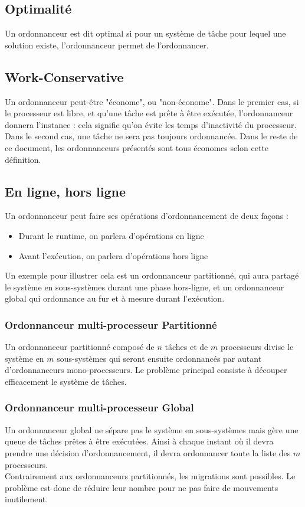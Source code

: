 \documentclass[11pt,a4paper,oneside]{report}
\begin{document}
\subsection{Optimalité}\label{optimal}
Un ordonnanceur est dit optimal si pour un système de tâche pour lequel une solution 
existe, l'ordonnanceur permet de l'ordonnancer.

\subsection{Work-Conservative} 
Un ordonnanceur peut-être "économe", ou "non-économe". Dans le premier cas, si le processeur est libre, 
et qu'une tâche est prête à être exécutée, l'ordonnanceur donnera l'instance : cela signifie 
qu'on évite les temps d'inactivité du processeur. Dans le second cas, une tâche ne sera pas toujours ordonnancée.
Dans le reste de ce document, les ordonnanceurs présentés sont tous économes selon cette définition.

\subsection{En ligne, hors ligne}
Un ordonnanceur peut faire ses opérations d'ordonnancement de deux façons : \\
\begin{itemize}
	\item Durant le runtime, on parlera d'opérations en ligne
	\item Avant l'exécution, on parlera d'opérations hors ligne
\end{itemize}
Un exemple pour illustrer cela est un ordonnanceur partitionné, qui aura partagé le système 
en sous-systèmes durant une phase hors-ligne, et un ordonnanceur global qui 
ordonnance au fur et à mesure durant l'exécution. 


\subsubsection{Ordonnanceur multi-processeur Partitionné}
Un ordonnanceur partitionné composé de $n$ tâches et de $m$ processeurs divise 
le système en $m$ sous-systèmes qui seront ensuite ordonnancés par autant d'ordonnanceurs 
mono-processeurs. Le problème principal consiste à découper efficacement le système de tâches.

\subsubsection{Ordonnanceur multi-processeur Global}
Un ordonnanceur global ne sépare pas le système en sous-systèmes mais gère une 
queue de tâches prêtes à être exécutées. Ainsi à chaque instant où il devra prendre une décision 
d'ordonnancement, il devra ordonnancer toute la liste des $m$ processeurs.\\
Contrairement aux ordonnanceurs partitionnés, les migrations sont possibles. Le problème 
est donc de réduire leur nombre pour ne pas faire de mouvements inutilement.
\end{document}
